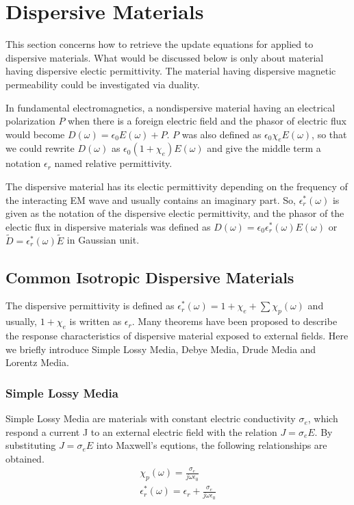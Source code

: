 \section{Dispersive Materials}
\label{sec:dispersive}
This section concerns how to retrieve the update equations for applied to dispersive materials. What would be discussed
below is only about material having dispersive electic permittivity. The material having dispersive magnetic
permeability could be investigated via duality.

In fundamental electromagnetics, a nondispersive material having an electrical polarization $P$ when there is a foreign
electric field and the phasor of electric flux would become $D(\omega) = \epsilon_0 E(\omega) + P$. $P$ was also defined
as $\epsilon_0 \chi_e E(\omega)$, so that we could rewrite $D(\omega)$ as $\epsilon_0 (1+\chi_e)E(\omega)$ and give the middle term a notation
$\epsilon_r$ named relative permittivity.

The dispersive material has its electic permittivity depending on the frequency of the interacting EM wave and usually
contains an imaginary part. So, $\epsilon_r^*(\omega)$ is given as the notation of the dispersive electic permittivity,
and the phasor of the electic flux in dispersive materials was defined as $D(\omega) = \epsilon_0
\epsilon_r^*(\omega)E(\omega)$ or $\widetilde{D} = \epsilon_r^*(\omega)\widetilde{E}$ in Gaussian unit.
\subsection{Common Isotropic Dispersive Materials}
The dispersive permittivity is defined as $\epsilon_r^*(\omega) = 1 + \chi_e + \sum \chi_p(\omega)$ and usually, $1 +
\chi_e$ is written as $\epsilon_r$. Many theorems have been proposed to describe the response characteristics of
dispersive material exposed to external fields. Here we briefly introduce Simple Lossy Media, Debye Media, Drude Media
and Lorentz Media.

\subsubsection{Simple Lossy Media}
Simple Lossy Media are materials with constant electric conductivity $\sigma_e$, which respond a current J to an
external electric field with the relation $J = \sigma_e E$. By substituting $J=\sigma_e E$ into
Maxwell's equtions, the following relationships are obtained.
\begin{gather}
  \chi_p(\omega) = \frac{\sigma_e}{j\omega\epsilon_0}\\
  \epsilon_r^*(\omega) = \epsilon_r + \frac{\sigma_e}{j\omega\epsilon_0}
\end{gather}

